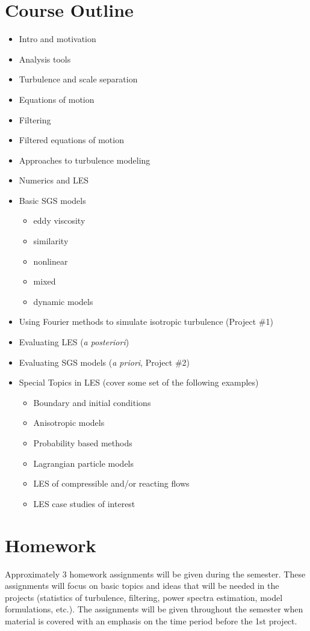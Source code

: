\documentclass[11pt]{article}
\theoremstyle{mytheor}
\begin{document}
\section*{Course Outline}
\begin{itemize}
\item Intro and motivation
\item Analysis tools
\item Turbulence and scale separation
\item Equations of motion
\item Filtering
\item Filtered equations of motion
\item Approaches to turbulence modeling
\item Numerics and LES
\item Basic SGS models
\begin{itemize}
\item eddy viscosity
\item similarity
\item nonlinear
\item mixed
\item dynamic models
\end{itemize}
\item Using Fourier methods to simulate isotropic turbulence (Project \#1)
\item Evaluating LES (\textit{a posteriori})
\item Evaluating SGS models (\textit{a priori}, Project \#2)
\item Special Topics in LES (cover some set of the following examples)
\begin{itemize}
\item Boundary and initial conditions
\item Anisotropic models
\item Probability based methods
\item Lagrangian particle models
\item LES of compressible and/or reacting flows
\item LES case studies of interest
\end{itemize}
\end{itemize}

\section*{Homework}
Approximately 3 homework assignments will be given during the semester. These assignments will focus on basic topics and ideas that will be needed in the projects (statistics of turbulence, filtering, power spectra estimation, model formulations, etc.).  The assignments will be given throughout the semester when material is covered with an emphasis on the time period before the 1st project.
\end{document}
